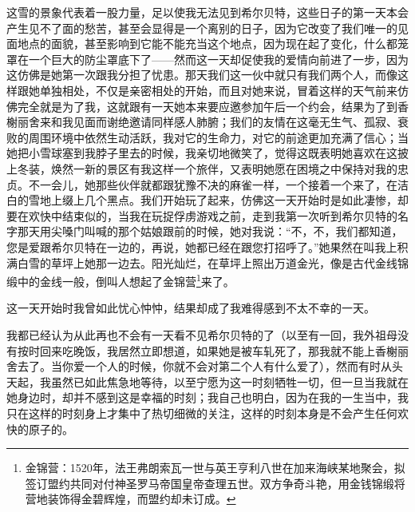 \par 这雪的景象代表着一股力量，足以使我无法见到希尔贝特，这些日子的第一天本会产生见不了面的愁苦，甚至会显得是一个离别的日子，因为它改变了我们唯一的见面地点的面貌，甚至影响到它能不能充当这个地点，因为现在起了变化，什么都笼罩在一个巨大的防尘罩底下了——然而这一天却促使我的爱情向前进了一步，因为这仿佛是她第一次跟我分担了忧患。那天我们这一伙中就只有我们两个人，而像这样跟她单独相处，不仅是亲密相处的开始，而且对她来说，冒着这样的天气前来仿佛完全就是为了我，这就跟有一天她本来要应邀参加午后一个约会，结果为了到香榭丽舍来和我见面而谢绝邀请同样感人肺腑；我们的友情在这毫无生气、孤寂、衰败的周围环境中依然生动活跃，我对它的生命力，对它的前途更加充满了信心；当她把小雪球塞到我脖子里去的时候，我亲切地微笑了，觉得这既表明她喜欢在这披上冬装，焕然一新的景区有我这样一个旅伴，又表明她愿在困境之中保持对我的忠贞。不一会儿，她那些伙伴就都跟犹豫不决的麻雀一样，一个接着一个来了，在洁白的雪地上缀上几个黑点。我们开始玩了起来，仿佛这一天开始时是如此凄惨，却要在欢快中结束似的，当我在玩捉俘虏游戏之前，走到我第一次听到希尔贝特的名字那天用尖嗓门叫喊的那个姑娘跟前的时候，她对我说：“不，不，我们都知道，您是爱跟希尔贝特在一边的，再说，她都已经在跟您打招呼了。”她果然在叫我上积满白雪的草坪上她那一边去。阳光灿烂，在草坪上照出万道金光，像是古代金线锦缎中的金线一般，倒叫人想起了金锦营\footnote{金锦营：1520年，法王弗朗索瓦一世与英王亨利八世在加来海峡某地聚会，拟签订盟约共同对付神圣罗马帝国皇帝查理五世。双方争奇斗艳，用金钱锦缎将营地装饰得金碧辉煌，而盟约却未订成。}来了。
\par 这一天开始时我曾如此忧心忡忡，结果却成了我难得感到不太不幸的一天。
\par 我都已经认为从此再也不会有一天看不见希尔贝特的了（以至有一回，我外祖母没有按时回来吃晚饭，我居然立即想道，如果她是被车轧死了，那我就不能上香榭丽舍去了。当你爱一个人的时候，你就不会对第二个人有什么爱了），然而有时从头天起，我虽然已如此焦急地等待，以至宁愿为这一时刻牺牲一切，但一旦当我就在她身边时，却并不感到这是幸福的时刻；我自己也明白，因为在我的一生当中，我只在这样的时刻身上才集中了热切细微的关注，这样的时刻本身是不会产生任何欢快的原子的。
